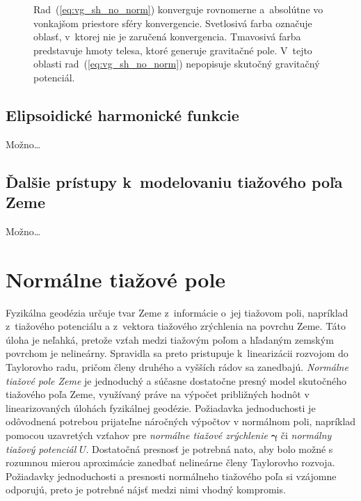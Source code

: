 \documentclass[a4paper,12pt]{book}
\begin{document}
\begin{figure}
\centering

\caption{Rad~(\ref{eq:vg_sh_no_norm}) konverguje rovnomerne a~absolútne vo
vonkajšom priestore sféry konvergencie.  Svetlosivá farba označuje oblasť,
v~ktorej nie je zaručená konvergencia.  Tmavosivá farba predstavuje hmoty
telesa, ktoré generuje gravitačné pole.  V~tejto oblasti
rad~(\ref{eq:vg_sh_no_norm}) nepopisuje skutočný gravitačný potenciál.}
\label{fig:spherical_harmonics_convergence}
\end{figure}







\section{Elipsoidické harmonické funkcie}

Možno\dots







\section{Ďalšie prístupy k~modelovaniu tiažového poľa Zeme}

Možno\dots










\chapter{Normálne tiažové pole}
\label{sec:normal_gravity_field}

Fyzikálna geodézia určuje tvar Zeme z~informácie o~jej tiažovom poli, napríklad 
z~tiažového potenciálu a z~vektora tiažového zrýchlenia na povrchu Zeme.  Táto 
úloha je neľahká, pretože vzťah medzi tiažovým poľom a hľadaným zemským 
povrchom je nelineárny.  Spravidla sa preto pristupuje k~linearizácii rozvojom 
do Taylorovho radu, pričom členy druhého a vyšších rádov sa zanedbajú.  
\emph{Normálne tiažové pole Zeme} je jednoduchý a súčasne dostatočne presný 
model skutočného tiažového poľa Zeme, využívaný práve na výpočet približných 
hodnôt v linearizovaných úlohách fyzikálnej geodézie.  Požiadavka jednoduchosti 
je odôvodnená potrebou prijateľne náročných výpočtov v normálnom poli, 
napríklad pomocou uzavretých vzťahov pre \emph{normálne tiažové zrýchlenie} 
$\boldsymbol{\gamma}$ či \emph{normálny tiažový potenciál} $U$.  Dostatočná 
presnosť je potrebná nato, aby bolo možné s rozumnou mierou aproximácie 
zanedbať nelineárne členy Taylorovho rozvoja.  Požiadavky jednoduchosti 
a presnosti normálneho tiažového poľa si vzájomne odporujú, preto je potrebné 
nájsť medzi nimi vhodný kompromis.
\end{document}
